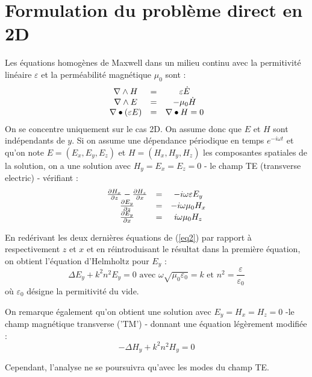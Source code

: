 \documentclass{article}
\begin{document}
\section{Formulation du problème direct en 2D}
Les équations homogènes de Maxwell dans un milieu continu avec la permitivité linéaire $\varepsilon$ et la perméabilité magnétique $\mu_0$ sont :
\begin{equation}\label{MaxEq}
\begin{array}{c c c}
	\nabla\wedge H&=& \varepsilon\dot{E}\\
	\nabla\wedge E&=& -\mu_0\dot{H}\\
	\nabla\bullet(\varepsilon E)&=&\nabla\bullet H=0
\end{array}
\end{equation}
On se concentre uniquement sur le cas 2D. On assume donc que $E$ et $H$ sont indépendants de $y$. Si on assume une dépendance périodique en temps $e^{-i\omega t}$ et qu'on note $E=(E_x,E_y,E_z)$ et $H=(H_x,H_y,H_z)$ les composantes spatiales de la solution, on a une solution avec $H_y=E_x=E_z=0$ - le champ TE (transverse electric) - vérifiant :
\begin{equation} \label{eq2}
\begin{array}{c c c}
	\frac{\partial H_x}{\partial z} - \frac{\partial H_z}{\partial x}&=&-i\omega\varepsilon E_y\\
	\frac{\partial E_y}{\partial z}&=&-i\omega\mu_0H_x\\
	\frac{\partial E_y}{\partial x}&=&i\omega\mu_0  H_z
\end{array}
\end{equation}

En redérivant les deux dernières équations de (\ref{eq2}) par rapport à respectivement $z$ et $x$ et en réintroduisant le résultat dans la première équation, on obtient l'équation d'Helmholtz pour $E_y$ :
\[ \Delta E_y + k^2n^2E_y = 0 \text{ avec } \omega\sqrt{\mu_0\varepsilon_0}=k \text{ et } n^2=\frac{\varepsilon}{\varepsilon_0} \]
où $\varepsilon_0$ désigne la permitivité du vide.

On remarque également qu'on obtient une solution avec $E_y=H_x=H_z=0$ -le champ magnétique transverse ('TM') - donnant une équation légèrement modifiée :
	\[-\Delta H_y+k^2n^2H_y=0\]

Cependant, l'analyse ne se poursuivra qu'avec les modes du champ TE.
\end{document}
